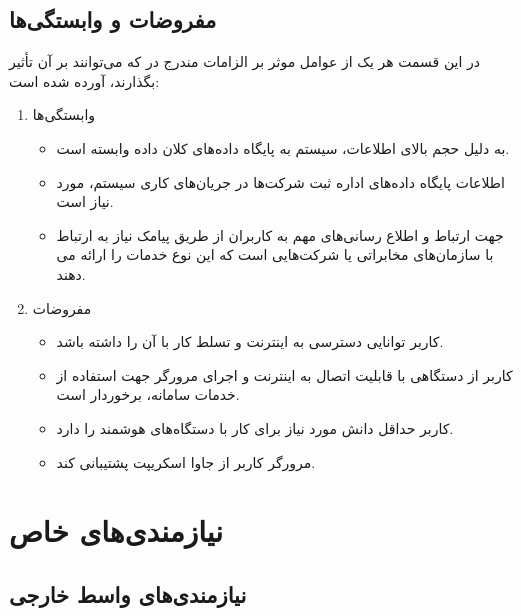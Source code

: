 \documentclass{report}
\begin{document}
			\subsection{مفروضات و وابستگی‌ها}
				در این قسمت هر یک از عوامل موثر بر الزامات مندرج در  که می‌توانند بر آن تأثیر بگذارند، آورده شده است:
				
				\begin{enumerate}
					\item وابستگی‌ها
					\begin{itemize}
						\item
						 به دلیل حجم بالای اطلاعات، سیستم به پایگاه داده‌های کلان داده وابسته است.
						\item
						 اطلاعات پایگاه داده‌های اداره ثبت شرکت‌ها در جریان‌های کاری سیستم، مورد نیاز است.
						\item 
						جهت ارتباط و اطلاع رسانی‌های مهم به کاربران از طریق پیامک نیاز به ارتباط با سازمان‌های مخابراتی یا شرکت‌هایی است که این نوع خدمات را ارائه می دهند.
					\end{itemize}
				
					\item مفروضات
					\begin{itemize}
						\item کاربر توانایی دسترسی به اینترنت و تسلط کار با آن را داشته باشد.
						\item کاربر از دستگاهی با قابلیت اتصال به اینترنت و اجرای مرورگر جهت استفاده از خدمات سامانه، برخوردار است.
						\item کاربر حداقل دانش مورد نیاز برای کار با دستگاه‌های هوشمند را دارد.
						\item مرورگر کاربر از جاوا اسکریپت پشتیبانی کند.
					\end{itemize}
				\end{enumerate}
			
		\section{نیازمندی‌های خاص}
			\subsection{نیازمندی‌های واسط خارجی}
\end{document}
